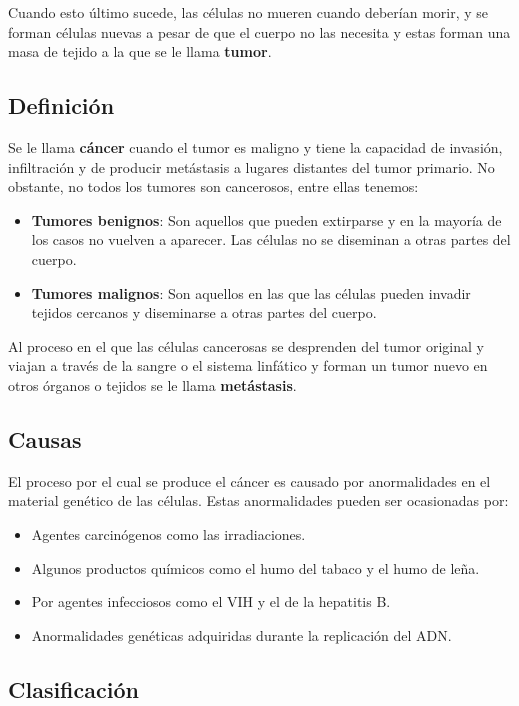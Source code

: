Cuando esto último sucede, las células no mueren cuando deberían morir, y se forman células nuevas a pesar de que el cuerpo no las necesita y estas forman una masa de tejido a la que se le llama \textbf{tumor}.

\subsection{Definición}

Se le llama \textbf{cáncer} cuando el tumor es maligno y tiene la capacidad de invasión, infiltración y de producir metástasis a lugares distantes del tumor primario. No obstante, no todos los tumores son cancerosos, entre ellas tenemos:
 
\begin{itemize}
	\item \textbf{Tumores benignos}: Son aquellos que pueden extirparse y en la mayoría de los casos no vuelven a aparecer. Las células no se diseminan a otras partes del cuerpo.
	\item \textbf{Tumores malignos}: Son aquellos en las que las células pueden invadir tejidos cercanos y diseminarse a otras partes del cuerpo.
\end{itemize}

Al proceso en el que las células cancerosas se desprenden del tumor original y viajan a través de la sangre o el sistema linfático y forman un tumor nuevo en otros órganos o tejidos se le llama \textbf{metástasis}.
\subsection{Causas}

El proceso por el cual se produce el cáncer es causado por anormalidades en el material genético de las células. Estas anormalidades pueden ser ocasionadas por:

\begin{itemize}
	\item Agentes carcinógenos como las irradiaciones. 
	\item Algunos productos químicos como el humo del tabaco y el humo de leña.
	\item Por agentes infecciosos como el VIH y el de la hepatitis B.
	\item Anormalidades genéticas adquiridas durante la replicación del ADN.
\end{itemize} 
\subsection{Clasificación}

